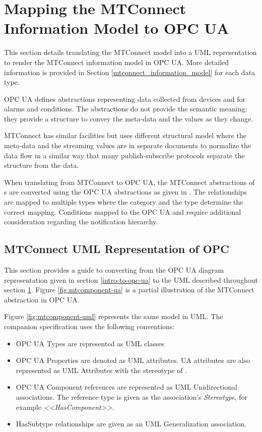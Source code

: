\section{Mapping the MTConnect Information Model to OPC UA} 
  \label{mtconnect-mapping}

This section details translating the MTConnect model into a UML representation to render the MTConnect information model in OPC UA. More detailed information is provided in Section \ref{mtconnect_information_model} for each data type.

OPC UA defines abstractions representing data collected from devices and for alarms and conditions. The abstractions do not provide the semantic meaning; they provide a structure to convey the meta-data and the values as they change. 

MTConnect has similar facilities but uses different structural model where the meta-data and the streaming values are in separate documents to normalize the data flow in a similar way that many publish-subscribe protocols separate the structure from the data.

When translating from MTConnect to OPC UA, the MTConnect abstractions of s are converted using the OPC UA   abstractions as given in \cite{UAPart8}.  The relationships are mapped to multiple  types where the category and the type determine the correct mapping. Conditions mapped to the OPC UA  and require additional consideration regarding the notification hierarchy. 

\subsection{MTConnect UML Representation of OPC}

This section provides a guide to converting from the OPC UA diagram representation given in section \ref{intro-to-opc-ua} to the UML described throughout section \ref{mtconnect-mapping}. Figure \ref{fig:mtcomponent-ua} is a partial illustration of the MTConnect  abstraction in OPC UA.



Figure \ref{fig:mtcomponent-uml} represents the same model in UML. The companion specification uses the following conventions:

\begin{itemize}
\item OPC UA Types are represented as UML classes
\item OPC UA Properties are denoted as UML attributes. UA attributes are also represented as UML Attributes with the stereotype of .
\item OPC UA Component references are represented as UML Unidirectional associations. The reference type is given as the association's \textit{Stereotype}, for example \textit{<<HasComponent>>}. 
\item HasSubtype relationships are given as an UML Generalization association.  
\end{itemize}


